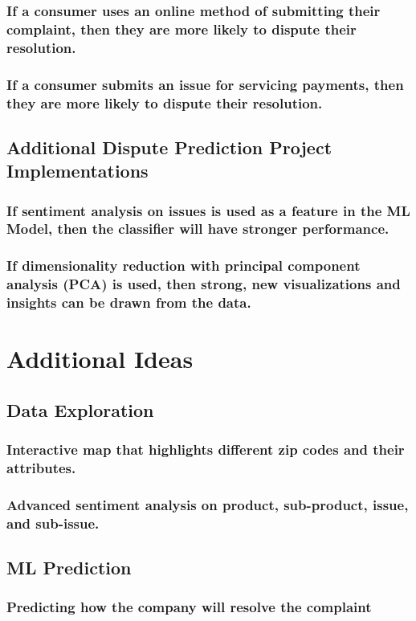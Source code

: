 \documentclass{report}
\begin{document}
\subsection{If a consumer uses an online method of submitting their complaint, then they are more likely to dispute their resolution.}
\subsection{If a consumer submits an issue for servicing payments, then they are more likely to dispute their resolution.}

\section{Additional Dispute Prediction Project Implementations}
\subsection{If sentiment analysis on issues is used as a feature in the ML Model, then the classifier will have stronger performance.}
\subsection{If dimensionality reduction with principal component analysis (PCA) is used, then strong, new visualizations and insights can be drawn from the data.}


\chapter{Additional Ideas}

\section{Data Exploration}
\subsection{Interactive map that highlights different zip codes and their attributes.}
\subsection{Advanced sentiment analysis on product, sub-product, issue, and sub-issue.}

\section{ML Prediction}
\subsection{Predicting how the company will resolve the complaint}
\end{document}
